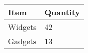 \documentclass{article}
\begin{document}
\begin{table}
\begin{tabular}{|l|l|}
\hline
Item & Quantity \\
\hline
Widgets & 42 \\
\hline
Gadgets & 13 \\
\hline
\end{tabular}
\end{table}
\end{document}
